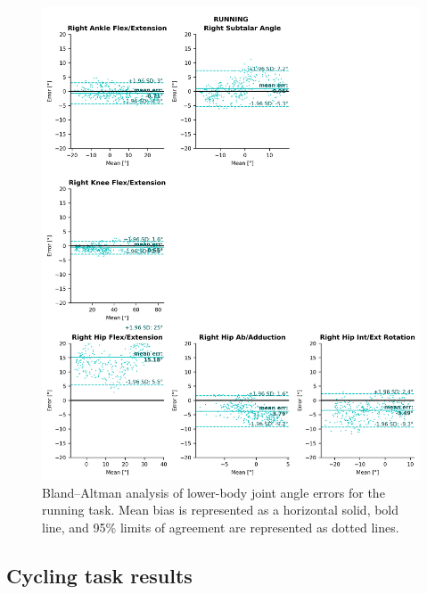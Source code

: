 \begin{figure}[!ht]
	\centering
	\def\svgwidth{1\columnwidth}
	\fontsize{10pt}{10pt}\selectfont
	\includegraphics[height=\dimexpr\textheight-119pt]{"../Annexes/Figures/Fig_BlandRun.png"}
	\caption{Bland–Altman analysis of lower-body joint angle errors for the running task. Mean bias is represented as a horizontal solid, bold line, and 95\% limits of agreement are represented as dotted lines.}
	\label{fig_blandrun}
\end{figure}

\clearpage

\subsection{Cycling task results}

